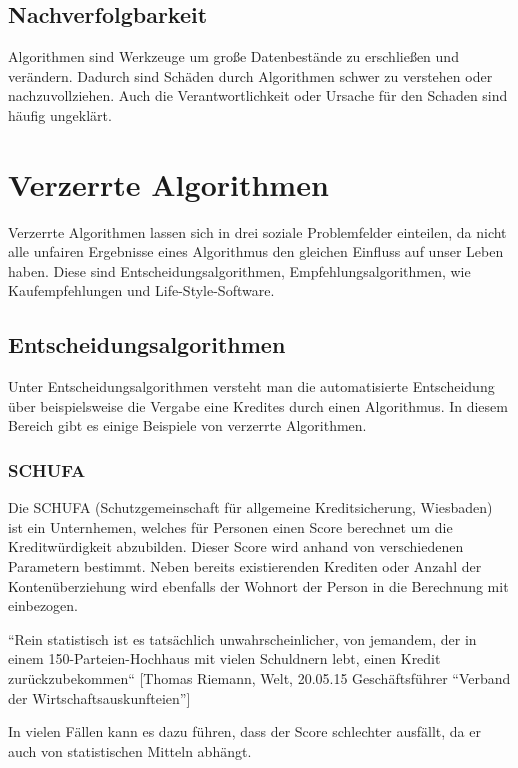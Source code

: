 \subsection{Nachverfolgbarkeit}
Algorithmen sind Werkzeuge um große Datenbestände zu erschließen und verändern. Dadurch sind Schäden durch Algorithmen schwer zu verstehen oder nachzuvollziehen. Auch die Verantwortlichkeit oder Ursache für den Schaden sind häufig ungeklärt.

\section{Verzerrte Algorithmen}

Verzerrte Algorithmen lassen sich in drei soziale Problemfelder einteilen, da nicht alle unfairen Ergebnisse eines Algorithmus den gleichen Einfluss auf unser Leben haben. 
Diese sind Entscheidungsalgorithmen, Empfehlungsalgorithmen, wie Kaufempfehlungen und Life-Style-Software.


\subsection{Entscheidungsalgorithmen}
Unter Entscheidungsalgorithmen versteht man die automatisierte Entscheidung über beispielsweise die Vergabe eine Kredites durch einen Algorithmus. In diesem Bereich gibt es einige Beispiele von verzerrte Algorithmen. 

\subsubsection{SCHUFA}
Die SCHUFA (Schutzgemeinschaft für allgemeine Kreditsicherung, Wiesbaden) ist ein Unternhemen, welches für Personen einen Score berechnet um die Kreditwürdigkeit abzubilden. Dieser Score wird anhand von verschiedenen Parametern bestimmt. Neben bereits existierenden Krediten oder Anzahl der Kontenüberziehung wird ebenfalls der Wohnort der Person in die Berechnung mit einbezogen. \newline

“Rein statistisch ist es tatsächlich unwahrscheinlicher, von jemandem, der in einem 150-Parteien-Hochhaus mit vielen Schuldnern lebt, einen Kredit zurückzubekommen“
[Thomas Riemann, Welt, 20.05.15 Geschäftsführer “Verband der Wirtschaftsauskunfteien”]

In vielen Fällen kann es dazu führen, dass der Score schlechter ausfällt, da er auch von statistischen Mitteln abhängt. 


